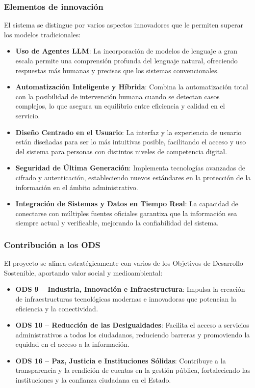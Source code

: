 \subsubsection{Elementos de innovación}
El sistema se distingue por varios aspectos innovadores que le permiten superar los modelos tradicionales:
\begin{itemize}
    \item \textbf{Uso de Agentes LLM}: La incorporación de modelos de lenguaje a gran escala permite una comprensión profunda del lenguaje natural, ofreciendo respuestas más humanas y precisas que los sistemas convencionales.
    \item \textbf{Automatización Inteligente y Híbrida}: Combina la automatización total con la posibilidad de intervención humana cuando se detectan casos complejos, lo que asegura un equilibrio entre eficiencia y calidad en el servicio.
    \item \textbf{Diseño Centrado en el Usuario}: La interfaz y la experiencia de usuario están diseñadas para ser lo más intuitivas posible, facilitando el acceso y uso del sistema para personas con distintos niveles de competencia digital.
    \item \textbf{Seguridad de Última Generación}: Implementa tecnologías avanzadas de cifrado y autenticación, estableciendo nuevos estándares en la protección de la información en el ámbito administrativo.
    \item \textbf{Integración de Sistemas y Datos en Tiempo Real}: La capacidad de conectarse con múltiples fuentes oficiales garantiza que la información sea siempre actual y verificable, mejorando la confiabilidad del sistema.
\end{itemize}

\subsubsection{Contribución a los ODS}
El proyecto se alinea estratégicamente con varios de los Objetivos de Desarrollo Sostenible, aportando valor social y medioambiental:
\begin{itemize}
    \item \textbf{ODS 9 -- Industria, Innovación e Infraestructura}: Impulsa la creación de infraestructuras tecnológicas modernas e innovadoras que potencian la eficiencia y la conectividad.
    \item \textbf{ODS 10 -- Reducción de las Desigualdades}: Facilita el acceso a servicios administrativos a todos los ciudadanos, reduciendo barreras y promoviendo la equidad en el acceso a la información.
    \item \textbf{ODS 16 -- Paz, Justicia e Instituciones Sólidas}: Contribuye a la transparencia y la rendición de cuentas en la gestión pública, fortaleciendo las instituciones y la confianza ciudadana en el Estado.
\end{itemize}

